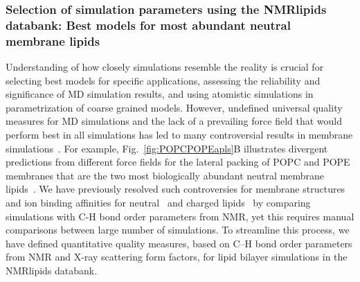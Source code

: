 \documentclass[fleqn,10pt]{wlscirep}
\begin{document}
\subsubsection{Selection of simulation parameters using the NMRlipids databank: Best models for most abundant neutral membrane lipids}
Understanding of how closely simulations resemble the reality is crucial for selecting best models for specific applications, assessing the reliability and significance of MD simulation results, and using atomistic simulations in parametrization of coarse grained models. However, undefined universal quality measures for MD simulations and the lack of a prevailing force field that would perform best in all simulations has led to many controversial results in membrane simulations~\cite{antila22b}. 
For example, Fig.~\ref{fig:POPCPOPEapls}B illustrates divergent predictions from different force fields for the lateral packing of POPC and POPE membranes that are the two most biologically abundant neutral membrane lipids~\cite{vanmeer08}. We have previously resolved such controversies for membrane structures and ion binding affinities for neutral~\cite{botan15,catte16} and charged lipids~\cite{antila19,bacle21} by comparing simulations with C-H bond order parameters from NMR, yet this requires manual comparisons between large number of simulations. To streamline this process,
we have defined quantitative quality measures, based on C--H bond order parameters from NMR and X-ray scattering form factors, for lipid bilayer simulations in the NMRlipids databank. 
\end{document}

